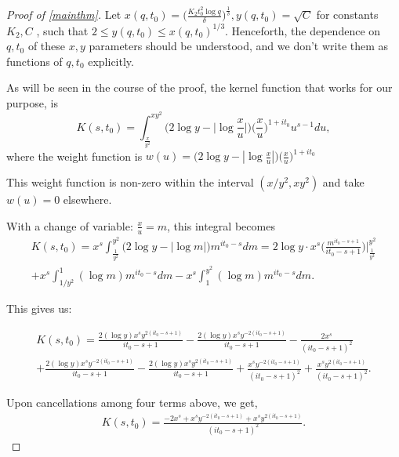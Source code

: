 \documentclass[letter,12pt]{article}
\theoremstyle{plain}
\theoremstyle{definition}
\theoremstyle{plain}
\begin{document}
\begin{proof}[Proof of \cref{mainthm}]
 Let $x(q,t_0)=\Big(\frac{K_2 t_{0}^{2}\log q}{\delta}\Big)^{\frac{1}{\delta}},y(q,t_0)=\sqrt{C}$  for constants $K_2,C$ , such that $2\leq y(q,t_0)\leq x(q,t_0)^{1/3}$. Henceforth, the dependence on $q, t_0$ of these $x,y$ parameters should be understood, and we don't write them as functions of $q,t_0$ explicitly.

 \bigskip
 
As will be seen in the course of the proof, the kernel function that works for our purpose, is
\begin{equation}
    K(s,t_0)=\int_{\frac{x}{y^{2}}}^{xy^{2}} \Big(2 \log y -\Big|\log \frac{x}{u}\Big|\Big)\Big(\frac{x}{u}\Big)^{1+it_0}u^{s-1} du,
\end{equation}
where the weight function is $w(u)=\big(2 \log y -|\log \frac{x}{u}|\big)\big(\frac{x}{u}\big)^{1+it_0}$


This weight function is  non-zero within the interval $(x/y^{2}, xy^{2})$ and take $w(u)=0$ elsewhere.

With a change of variable: $\frac{x}{u}=m$, this integral becomes 
\begin{multline}
    K(s,t_0)=x^{s}\int_{\frac{1}{y^{2}}}^{y^{2}} \Big( 2\log y -|\log m|  \Big) m^{it_0 -s} dm=2\log y\cdot x^{s} \Big( \frac{m^{it_0 -s+1}}{it_0 -s+1} \Big)|_{\frac{1}{y^{2}}}^{y^{2}}\\
    +x^{s}\int_{1/y^{2}}^{1} (\log m) m^{it_0 -s}dm -x^{s}\int_{1}^{y^{2}}(\log m) m^{it_0 -s} dm.
\end{multline}

\noindent This gives us:

\begin{multline}
    K(s,t_0)=\frac{2(\log y) x^{s} y^{2(it_0 -s +1)} }{it_0 -s+1}-\frac{2(\log y) x^{s} y^{-2(it_0 -s +1)} }{it_0 -s+1} -\frac{2x^{s}}{(it_0 -s+1)^{2}}\\ +\frac{2(\log y) x^{s} y^{-2(it_0 -s +1)} }{it_0 -s+1}-\frac{2(\log y) x^{s} y^{2(it_0 -s +1)} }{it_0 -s+1}+\frac{x^{s}y^{-2(it_0 -s+1)}}{(it_0-s+1)^{2}}+\frac{x^{s}y^{2(it_0 -s+1)}}{(it_0-s+1)^{2}}.
\end{multline}

Upon cancellations among four terms above, we get, 
\begin{align}
    K(s,t_0)=\frac{-2x^s +x^s y^{-2(it_0 -s+1)} +x^s y^{2(it_0 -s +1)} }{(it_0 -s+1)^2}.
\end{align}


\end{proof}
\end{document}
